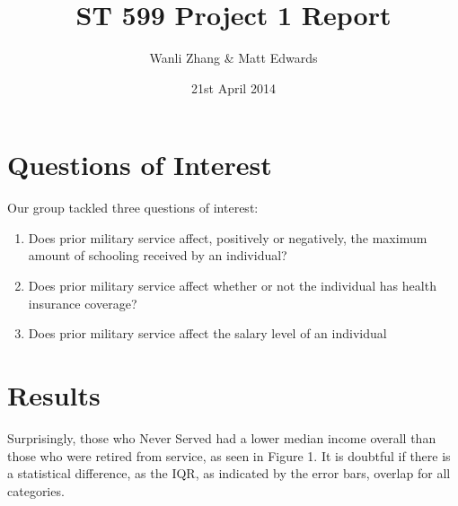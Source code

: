 \documentclass{article}
\title{ST 599 Project 1 Report}
\author{Wanli Zhang \& Matt Edwards}
\date{21st April 2014}
\begin{document}
\maketitle %


\section{Questions of Interest}
Our group tackled three questions of interest:

\begin{enumerate}

\item Does prior military service affect, positively or negatively, the maximum amount of schooling received by an individual? %
\item Does prior military service affect whether or not the individual has health insurance coverage? 
\item Does prior military service affect the salary level of an individual
\end{enumerate}

\section{Results}
Surprisingly, those who Never Served had a lower median income overall than those who were retired from service, as seen in Figure 1. It is doubtful if there is a statistical difference, as the IQR, as indicated by the error bars, overlap for all categories. 
\end{document}
